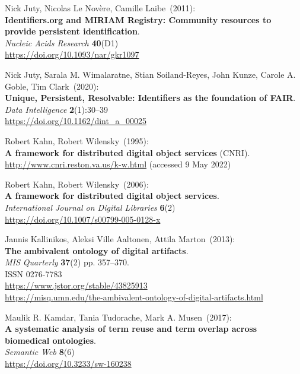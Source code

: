 \begin{thebibliography}{9}
Nick Juty, Nicolas Le Novère, Camille Laibe~(2011): \\
\textbf{Identifiers.org and {MIRIAM Registry}: Community resources to provide persistent identification}.\\
\emph{Nucleic Acids Research} \textbf{40}(D1) \\
\url{https://doi.org/10.1093/nar/gkr1097}

Nick Juty, Sarala M. Wimalaratne, Stian Soiland-Reyes, John Kunze, Carole A. Goble, Tim Clark~(2020): \\
\textbf{Unique, Persistent, Resolvable: Identifiers as the foundation of FAIR}.
\emph{Data Intelligence} \textbf{2}(1):30–39\\
\url{https://doi.org/10.1162/dint_a_00025}

Robert Kahn, Robert Wilensky~(1995): \\
\textbf{A framework for distributed digital object services} (CNRI).\\
\url{http://www.cnri.reston.va.us/k-w.html} (accessed 9 May 2022)

Robert Kahn, Robert Wilensky~(2006): \\
\textbf{A framework for distributed digital object services}.\\
\emph{International Journal on Digital Libraries} \textbf{6}(2)\\
\url{https://doi.org/10.1007/s00799-005-0128-x}

Jannis Kallinikos, Aleksi Ville Aaltonen, Attila Marton~(2013): \\
\textbf{The ambivalent ontology of digital artifacts}.\\ 
\emph{MIS Quarterly} \textbf{37}(2) pp. 357--370.\\
ISSN 0276-7783\\
\url{https://www.jstor.org/stable/43825913}\\
\url{https://misq.umn.edu/the-ambivalent-ontology-of-digital-artifacts.html}

Maulik R. Kamdar, Tania Tudorache, Mark A. Musen~(2017): \\
\textbf{A systematic analysis of term reuse and term overlap across biomedical ontologies}. \\
\emph{Semantic Web} \textbf{8}(6) \\
\url{https://doi.org/10.3233/sw-160238}


\end{thebibliography}
